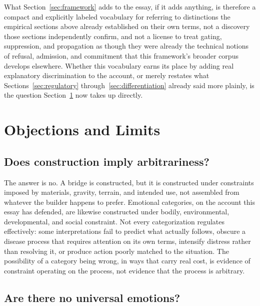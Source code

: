 \documentclass[11pt]{article}
\begin{document}
What Section~\ref{sec:framework} adds to the essay, if it adds anything, is therefore a compact and explicitly labeled vocabulary for referring to distinctions the empirical sections above already established on their own terms, not a discovery those sections independently confirm, and not a license to treat gating, suppression, and propagation as though they were already the technical notions of refusal, admission, and commitment that this framework's broader corpus develops elsewhere. Whether this vocabulary earns its place by adding real explanatory discrimination to the account, or merely restates what Sections~\ref{sec:regulatory} through~\ref{sec:differentiation} already said more plainly, is the question Section~\ref{sec:objections} now takes up directly.

\section{Objections and Limits}\label{sec:objections}

\subsection{Does construction imply arbitrariness?}

The answer is no. A bridge is constructed, but it is constructed under constraints imposed by materials, gravity, terrain, and intended use, not assembled from whatever the builder happens to prefer. Emotional categories, on the account this essay has defended, are likewise constructed under bodily, environmental, developmental, and social constraint. Not every categorization regulates effectively: some interpretations fail to predict what actually follows, obscure a disease process that requires attention on its own terms, intensify distress rather than resolving it, or produce action poorly matched to the situation. The possibility of a category being wrong, in ways that carry real cost, is evidence of constraint operating on the process, not evidence that the process is arbitrary.

\subsection{Are there no universal emotions?}
\end{document}
